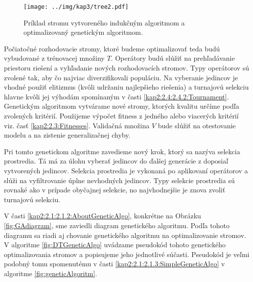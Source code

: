 \begin{figure}[h]
\centering
\centerline{\mbox{\texttt{[image: ../img/kap3/tree2.pdf]}}}
\caption{Príklad stromu vytvoreného indukčným algoritmom a optimalizovaný genetickým algoritmom.}\label{fig:treeGA}
\end{figure}

Počiatočné rozhodovacie stromy, ktoré budeme optimalizovať teda budú vybudované z trénovacej množiny $T$. Operátory budú slúžiť na prehľadávanie priestoru riešení a vyhľadanie nových rozhodovacích stromov. Typy operátorov sú zvolené tak, aby čo najviac diverzifikovali populáciu. Na vyberanie jedincov je vhodné použiť elitizmus (kvôli udržaniu najlepšieho riešenia) a turnajovú selekciu hlavne kvôli jej výhodám spomínaným v časti \ref{kap2:2.4:2.4.2:Tournament}. Genetickým algoritmom vytvárame nové stromy, ktorých kvalitu určíme podľa zvolených kritérií. Použijeme výpočet fitness z jedného alebo viacerých kritérií viz. časť \ref{kap2:2.3:Fitnesses}. Validačná množina $V$ bude slúžiť na otestovanie modelu a na zistenie generalizačnej chyby.

Pri tomto genetickom algoritme zavedieme nový krok, ktorý sa nazýva selekcia prostredia. Tá má za úlohu vyberať jedincov do ďalšej generácie z doposiaľ vytvorených jedincov. Selekcia prostredia je vykonaná po aplikovaní operátorov a slúži na vyfiltrovanie úplne nevhodných jedincov. Typy selekcie prostredia sú rovnaké ako v prípade obyčajnej selekcie, no najvhodnejšie je znova zvoliť turnajovú selekciu.

V časti \ref{kap2:2.1:2.1.2:AboutGeneticAlgo}, konkrétne na Obrázku \ref{fig:GAdiagram}, sme zaviedli diagram genetického algoritmu. Podľa tohoto diagramu sa riadi aj chovanie genetického algoritmu na optimalizovanie stromov.
V algoritme \ref{fig:DTGeneticAlgo} uvádzame pseudokód tohoto genetického optimalizovania stromov a popisujeme jeho jednotlivé súčasti.
Pseudokód je veľmi podobný tomu spomenutému v časti \ref{kap2:2.1:2.1.3:SimpleGeneticAlgo} v algoritme \ref{fig:geneticAlgoritm}.

